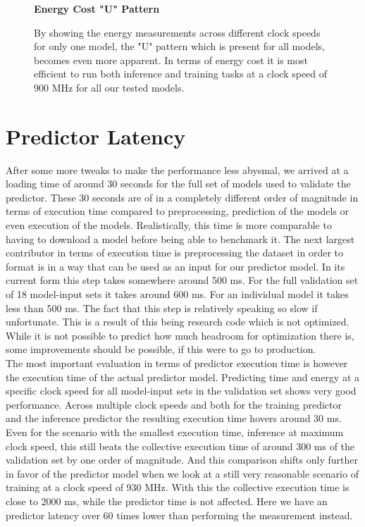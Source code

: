 \begin{figure}[htbp]
    \centering
    \parbox{0.7\textwidth}{\centering\textbf{Energy Cost "U" Pattern}}
    \caption{By showing the energy measurements across different clock speeds for only one model, the "U" pattern which is present for all models, becomes even more apparent. In terms of energy cost it is most efficient to run both inference and training tasks at a clock speed of $900$ MHz for all our tested models.}
    \label{fig:pattern}
\end{figure}

\section{Predictor Latency}


After some more tweaks to make the performance less abysmal, we arrived at a loading time of around 30 seconds for the full set of models used to validate the predictor. These 30 seconds are of in a completely different order of magnitude in terms of execution time compared to preprocessing, prediction of the models or even execution of the models. Realistically, this time is more comparable to having to download a model before being able to benchmark it. The next largest contributor in terms of execution time is preprocessing the dataset in order to format is in a way that can be used as an input for our predictor model. In its current form this step takes somewhere around 500 ms. For the full validation set of 18 model-input sets it takes around 600 ms. For an individual model it takes less than 500 ms. The fact that this step is relatively speaking so slow if unfortunate. This is a result of this being research code which is not optimized. While it is not possible to predict how much headroom for optimization there is, some improvements should be possible, if this were to go to production. \\
The most important evaluation in terms of predictor execution time is however the execution time of the actual predictor model. Predicting time and energy at a specific clock speed for all model-input sets in the validation set shows very good performance. Across multiple clock speeds and both for the training predictor and the inference predictor the resulting execution time hovers around 30 ms. Even for the scenario with the smallest execution time, inference at maximum clock speed, this still beats the collective execution time of around 300 ms of the validation set by one order of magnitude. And this comparison shifts only further in favor of the predictor model when we look at a still very reasonable scenario of training at a clock speed of 930 MHz. With this the collective execution time is close to 2000 ms, while the predictor time is not affected. Here we have an predictor latency over 60 times lower than performing the measurement instead.

